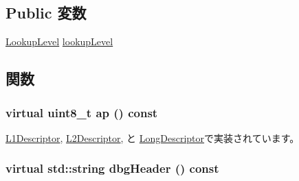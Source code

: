 \subsection*{Public 変数}
\begin{DoxyCompactItemize}
\item 
\hyperlink{namespaceArmISA_aefa4213b348e38ee69f2a6109563a7bd}{LookupLevel} \hyperlink{classArmISA_1_1TableWalker_1_1DescriptorBase_a88477771eb7d27741455a8035678c67a}{lookupLevel}
\end{DoxyCompactItemize}


\subsection{関数}
\hypertarget{classArmISA_1_1TableWalker_1_1DescriptorBase_ab524583b20762c07d0a20a418b858586}{
\subsubsection[{ap}]{\setlength{\rightskip}{0pt plus 5cm}virtual uint8\_\-t ap () const}}
\label{classArmISA_1_1TableWalker_1_1DescriptorBase_ab524583b20762c07d0a20a418b858586}


\hyperlink{classArmISA_1_1TableWalker_1_1L1Descriptor_a4fc87654615da601dbbc3cb6dd1046ee}{L1Descriptor}, \hyperlink{classArmISA_1_1TableWalker_1_1L2Descriptor_a4fc87654615da601dbbc3cb6dd1046ee}{L2Descriptor}, と \hyperlink{classArmISA_1_1TableWalker_1_1LongDescriptor_a4fc87654615da601dbbc3cb6dd1046ee}{LongDescriptor}で実装されています。\hypertarget{classArmISA_1_1TableWalker_1_1DescriptorBase_a16f3fe8786507522f0f0298cb6c414f1}{
\subsubsection[{dbgHeader}]{\setlength{\rightskip}{0pt plus 5cm}virtual std::string dbgHeader () const}}
\label{classArmISA_1_1TableWalker_1_1DescriptorBase_a16f3fe8786507522f0f0298cb6c414f1}


